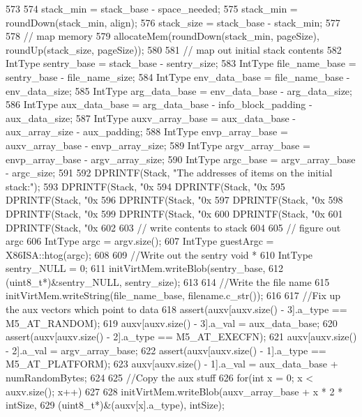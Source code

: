 \begin{DoxyCode}
{573 
574     stack_min = stack_base - space_needed;
575     stack_min = roundDown(stack_min, align);
576     stack_size = stack_base - stack_min;
577 
578     // map memory
579     allocateMem(roundDown(stack_min, pageSize), roundUp(stack_size, pageSize));
580 
581     // map out initial stack contents
582     IntType sentry_base = stack_base - sentry_size;
583     IntType file_name_base = sentry_base - file_name_size;
584     IntType env_data_base = file_name_base - env_data_size;
585     IntType arg_data_base = env_data_base - arg_data_size;
586     IntType aux_data_base = arg_data_base - info_block_padding - aux_data_size;
587     IntType auxv_array_base = aux_data_base - aux_array_size - aux_padding;
588     IntType envp_array_base = auxv_array_base - envp_array_size;
589     IntType argv_array_base = envp_array_base - argv_array_size;
590     IntType argc_base = argv_array_base - argc_size;
591 
592     DPRINTF(Stack, "The addresses of items on the initial stack:\n");
593     DPRINTF(Stack, "0x%
594     DPRINTF(Stack, "0x%
595     DPRINTF(Stack, "0x%
596     DPRINTF(Stack, "0x%
597     DPRINTF(Stack, "0x%
598     DPRINTF(Stack, "0x%
599     DPRINTF(Stack, "0x%
600     DPRINTF(Stack, "0x%
601     DPRINTF(Stack, "0x%
602 
603     // write contents to stack
604 
605     // figure out argc
606     IntType argc = argv.size();
607     IntType guestArgc = X86ISA::htog(argc);
608 
609     //Write out the sentry void *
610     IntType sentry_NULL = 0;
611     initVirtMem.writeBlob(sentry_base,
612             (uint8_t*)&sentry_NULL, sentry_size);
613 
614     //Write the file name
615     initVirtMem.writeString(file_name_base, filename.c_str());
616 
617     //Fix up the aux vectors which point to data
618     assert(auxv[auxv.size() - 3].a_type == M5_AT_RANDOM);
619     auxv[auxv.size() - 3].a_val = aux_data_base;
620     assert(auxv[auxv.size() - 2].a_type == M5_AT_EXECFN);
621     auxv[auxv.size() - 2].a_val = argv_array_base;
622     assert(auxv[auxv.size() - 1].a_type == M5_AT_PLATFORM);
623     auxv[auxv.size() - 1].a_val = aux_data_base + numRandomBytes;
624 
625     //Copy the aux stuff
626     for(int x = 0; x < auxv.size(); x++)
627     {
628         initVirtMem.writeBlob(auxv_array_base + x * 2 * intSize,
629                 (uint8_t*)&(auxv[x].a_type), intSize);
}}
\end{DoxyCode}
